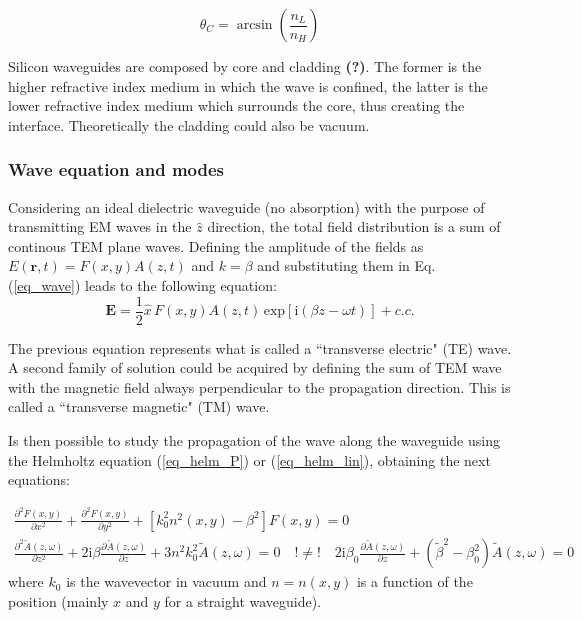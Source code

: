 \documentclass[12pt,a4paper,twoside]{article}
\begin{document}
$$	\theta_C = \arcsin \left( \frac{n_L}{n_H} \right)$$

Silicon waveguides are composed by core and cladding \textbf{(?)}. %
The former is the higher refractive index medium in which the wave is confined, the latter is the lower refractive index medium which surrounds the core, thus creating the interface. Theoretically the cladding could also be vacuum.

\subsubsection*{Wave equation and modes}
Considering an ideal dielectric waveguide (no absorption) with the purpose of transmitting EM waves in the $\hat{z}$ direction, the total field distribution is a sum of continous TEM plane waves.
Defining the amplitude of the fields as $E(\textbf{r},t) = F(x,y)A(z,t)$ and $k=\beta$ and substituting them in Eq. (\ref{eq_wave}) leads to the following equation:
\begin{equation*}
	\textbf{E} = \frac{1}{2}\hat{x}\,F(x,y)A(z,t)\,\mathrm{exp}[\mathrm{i}(\beta z-\omega t)] + c.c.
\end{equation*}

The previous equation represents what is called a ``transverse electric" (TE) wave.
A second family of solution could be acquired by defining the sum of TEM wave with the magnetic field always perpendicular to the propagation direction.
This is called a ``transverse magnetic" (TM) wave.

Is then possible to study the propagation of the wave along the waveguide using the Helmholtz equation (\ref{eq_helm_P}) or (\ref{eq_helm_lin}), obtaining the next equations:

\begin{subequations}
\begin{align}
	\frac{\partial^2F(x,y)}{\partial x^2} + \frac{\partial^2F(x,y)}{\partial y^2} + \left[ k_0^2n^2(x,y)-\beta^2\right]F(x,y) = 0
	\label{eq_wg_a} \\
	\frac{\partial^2\tilde{A}(z,\omega)}{\partial z^2} +2\mathrm{i}\beta\frac{\partial \tilde{A}(z,\omega)}{\partial z} +3n^2k_0^2\tilde{A}(z,\omega) = 0
	\quad ! \neq ! \quad
	2\mathrm{i}\beta_0\frac{\partial \tilde{A}(z,\omega)}{\partial z} +(\tilde{\beta}^2 - \beta_0^2)\tilde{A}(z,\omega) = 0
	\label{eq_wg_b}
\end{align}
\end{subequations}
where $k_0$ is the wavevector in vacuum and $n=n(x,y)$ is a function of the position (mainly $x$ and $y$ for a straight waveguide).
\end{document}
